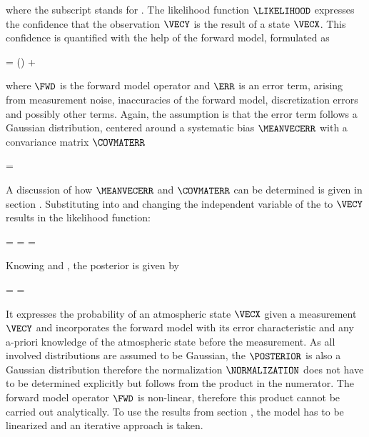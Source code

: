     where the subscript  stands for .  The likelihood
    function $\LIKELIHOOD$ expresses the confidence that the observation
    $\VECY$ is the result of a state $\VECX$. This confidence is quantified
    with the help of the forward model, formulated as

    \startformula
        \VECY = \FWD(\VECX) + \ERR \EQCOMMA
    \stopformula

    where $\FWD$ is the forward model operator and $\ERR$ is an error term,
    arising from measurement noise, inaccuracies of the forward model,
    discretization errors and possibly other terms. Again, the assumption is
    that the error term follows a Gaussian distribution, centered around
    a systematic bias $\MEANVECERR$ with a convariance matrix $\COVMATERR$

    \startformula
        \PROB{\ERR} = \GAUSS{\ERR}{\MEANVECERR}{\COVMATERR} \EQSTOP
    \stopformula

    A discussion of how $\MEANVECERR$ and $\COVMATERR$ can be determined is
    given in section . Substituting 
    into  and changing the independent variable of
    the {\PDF} to $\VECY$ results in the likelihood function:
    
    \placesubformula
    \startformula
    \startalign[n=3,align={right,middle,left}]
        \NC \PROB{\VECY - \FWD(\VECX)} = \NC
            \GAUSS{\VECY - \FWD(\VECX)}{\MEANVECERR}{\COVMATERR} \NC \NR
        \NC = \NC \GAUSS{\VECY}{\FWD(\VECX)+\MEANVECERR}{\COVMATERR} \NC
            = \LIKELIHOOD \EQSTOP {}
    \stopalign
    \stopformula

    Knowing  and , the
    posterior {\PDF} is given by

    \startformula
        \POSTERIOR
        = \frac{\LIKELIHOOD \PRIOR}{\NORMALIZATION}
        = \frac{\GAUSS{\VECY}{\FWD(\VECX) + \MEANVECERR}{\COVMATERR}
            ~\GAUSS{\VECX}{\MEANVECA}{\COVMATA}}{\NORMALIZATION} \EQSTOP
    \stopformula

    It expresses the probability of an atmospheric state $\VECX$ given a
    measurement $\VECY$ and incorporates the forward model with its error
    characteristic and any a-priori knowledge of the atmospheric state before
    the measurement. As all involved distributions are assumed to be Gaussian,
    the $\POSTERIOR$ is also a Gaussian distribution therefore the
    normalization $\NORMALIZATION$ does not have to be determined explicitly
    but follows from the product in the numerator. The forward model operator
    $\FWD$ is non-linear, therefore this product cannot be carried out
    analytically. To use the results from section , the
    model has to be linearized and an iterative approach is taken.

